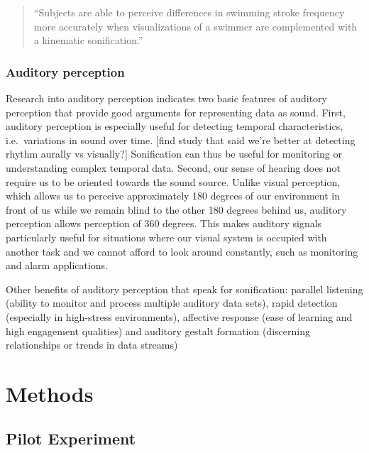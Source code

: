 \documentclass[10pt,a4paper,onecolumn]{article}
\begin{document}
\begin{quote}
``Subjects are able to perceive differences in swimming stroke frequency more accurately when visualizations of a swimmer are complemented with a kinematic sonification.'' \autocite{gerdschmitzSoundJoinedActions2017}
\end{quote}

\hypertarget{auditory-perception}{%
\subsubsection{Auditory perception}\label{auditory-perception}}

Research into auditory perception indicates two basic features of auditory perception that provide good arguments for representing data as sound. First, auditory perception is especially useful for detecting temporal characteristics, i.e.~variations in sound over time. {[}find study that said we're better at detecting rhythm aurally vs visually?{]} Sonification can thus be useful for monitoring or understanding complex temporal data. Second, our sense of hearing does not require us to be oriented towards the sound source. Unlike visual perception, which allows us to perceive approximately 180 degrees of our environment in front of us while we remain blind to the other 180 degrees behind us, auditory perception allows perception of 360 degrees. This makes auditory signals particularly useful for situations where our visual system is occupied with another task and we cannot afford to look around constantly, such as monitoring and alarm applications. \autocite{kramerSonificationReportStatus1999}

Other benefits of auditory perception that speak for sonification: parallel listening (ability to monitor and process multiple auditory data sets), rapid detection (especially in high-stress environments), affective response (ease of learning and high engagement qualities) and auditory gestalt formation (discerning relationships or trends in data streams) \autocite{kramerSonificationReportStatus1999}

\hypertarget{methods}{%
\section{Methods}\label{methods}}

\hypertarget{pilot-experiment}{%
\subsection{Pilot Experiment}\label{pilot-experiment}}
\end{document}
